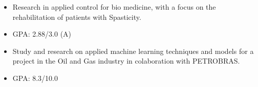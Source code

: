 \documentclass[10pt,a4paper,ragged2e,withhyper]{altacv}
\begin{document}
\begin{paracol}{2}
            \begin{itemize}
                \item Research in applied control for bio medicine, with a focus on the rehabilitation of patients with Spasticity.
            \end{itemize}
            \divider
        
            \begin{itemize}
                \item GPA: 2.88/3.0 (A)
                \item Study and research on applied machine learning techniques and models for a project in the Oil and Gas industry in colaboration with PETROBRAS.
            \end{itemize}
            \divider
            
            \begin{itemize}
                \item GPA: 8.3/10.0
            \end{itemize}
        
            
            

\end{paracol}
\end{document}
